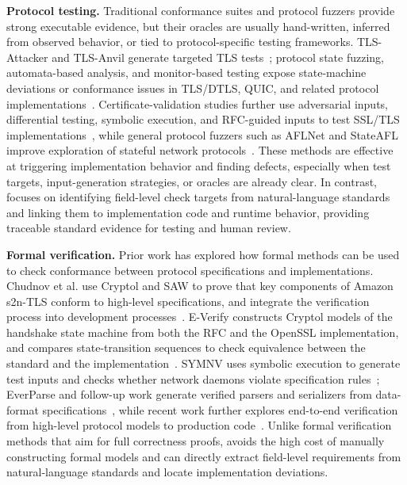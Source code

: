 \noindent \textbf{Protocol testing.}
Traditional conformance suites and protocol fuzzers provide strong executable
evidence, but their oracles are usually hand-written, inferred from observed
behavior, or tied to protocol-specific testing frameworks. TLS-Attacker and
TLS-Anvil generate targeted TLS
tests~\cite{somorovsky2016tlsattacker,maehren2022tlsanvil}; protocol state
fuzzing, automata-based analysis, and monitor-based testing expose state-machine
deviations or conformance issues in TLS/DTLS, QUIC, and related protocol
implementations~\cite{de2015protocol,fiterau2020dtls,fiterau2023automata,beurdouche2015messy,asadian2024monitor,piraux2018quicevolution}.
Certificate-validation studies further use adversarial inputs, differential
testing, symbolic execution, and RFC-guided inputs to test SSL/TLS
implementations~\cite{brubaker2014frankencert,chen2015guided,chen2018rfc,chen2017hvlearn,chau2017symcerts},
while general protocol fuzzers such as AFLNet and StateAFL improve exploration
of stateful network
protocols~\cite{pham2020aflnet,natella2022stateafl,natella2021profuzzbench,ba2022stateful}.
These methods are effective at triggering implementation behavior and finding
defects, especially when test targets, input-generation strategies, or oracles
are already clear. In contrast, \tool{} focuses on identifying field-level
check targets from natural-language standards and linking them to
implementation code and runtime behavior, providing traceable standard
evidence for testing and human review.


\noindent \textbf{Formal verification.}
Prior work has explored how formal methods can be used to check conformance
between protocol specifications and implementations. Chudnov et al. use Cryptol
and SAW to prove that key components of Amazon s2n-TLS conform to high-level
specifications, and integrate the verification process into development
processes~\cite{s2ntls,cryptol,saw,chudnov2018s2n}. E-Verify constructs
Cryptol models of the handshake state machine from both the RFC and the OpenSSL
implementation, and compares state-transition sequences to check equivalence
between the standard and the
implementation~\cite{guan2025openssltls13}. SYMNV uses symbolic execution to
generate test inputs and checks whether network daemons violate specification
rules~\cite{song2011symnv}; EverParse and follow-up work generate verified
parsers and serializers from data-format
specifications~\cite{ramananandro2019everparse,swamy2022everparse3d}, while
recent work further explores end-to-end verification from high-level protocol
models to production code~\cite{pereira2024protocolstocode,arquint2022modular}.
Unlike formal verification methods that aim for full correctness proofs,
\tool{} avoids the high cost of manually constructing formal models and can
directly extract field-level requirements from natural-language standards and
locate implementation deviations.


